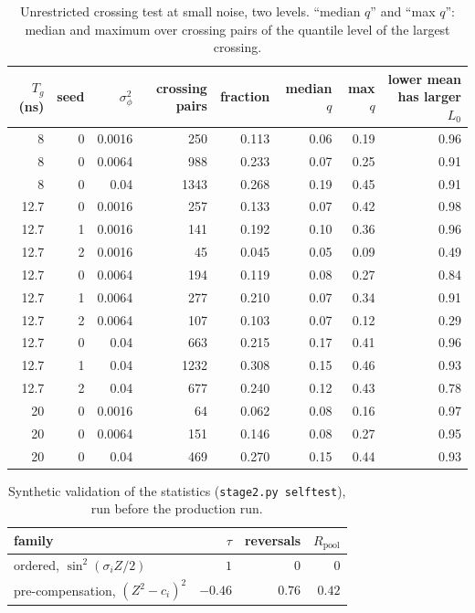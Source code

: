 \documentclass[aps,pra,onecolumn,notitlepage,superscriptaddress,nofootinbib,floatfix]{revtex4-2}
\begin{document}
\begin{table}[htbp]
\centering\small
\begin{tabular}{@{}rrrrrrrr@{}}
\toprule
$T_g$ (ns) & seed & $\sigma_\phi^2$ & crossing pairs & fraction & median $q$ & max $q$ & lower mean has larger $L_0$\\
\midrule
8 & 0 & 0.0016 & 250 & 0.113 & 0.06 & 0.19 & 0.96\\
8 & 0 & 0.0064 & 988 & 0.233 & 0.07 & 0.25 & 0.91\\
8 & 0 & 0.04 & 1343 & 0.268 & 0.19 & 0.45 & 0.91\\
12.7 & 0 & 0.0016 & 257 & 0.133 & 0.07 & 0.42 & 0.98\\
12.7 & 1 & 0.0016 & 141 & 0.192 & 0.10 & 0.36 & 0.96\\
12.7 & 2 & 0.0016 & 45 & 0.045 & 0.05 & 0.09 & 0.49\\
12.7 & 0 & 0.0064 & 194 & 0.119 & 0.08 & 0.27 & 0.84\\
12.7 & 1 & 0.0064 & 277 & 0.210 & 0.07 & 0.34 & 0.91\\
12.7 & 2 & 0.0064 & 107 & 0.103 & 0.07 & 0.12 & 0.29\\
12.7 & 0 & 0.04 & 663 & 0.215 & 0.17 & 0.41 & 0.96\\
12.7 & 1 & 0.04 & 1232 & 0.308 & 0.15 & 0.46 & 0.93\\
12.7 & 2 & 0.04 & 677 & 0.240 & 0.12 & 0.43 & 0.78\\
20 & 0 & 0.0016 & 64 & 0.062 & 0.08 & 0.16 & 0.97\\
20 & 0 & 0.0064 & 151 & 0.146 & 0.08 & 0.27 & 0.95\\
20 & 0 & 0.04 & 469 & 0.270 & 0.15 & 0.44 & 0.93\\
\bottomrule
\end{tabular}
\caption{Unrestricted crossing test at small noise, two levels. ``median
$q$'' and ``max $q$'': median and maximum over crossing pairs of the quantile
level of the largest crossing.}
\label{tab:crossing}
\end{table}

\begin{table}[htbp]
\centering\small
\begin{tabular}{@{}lrrr@{}}
\toprule
family & $\tau$ & reversals & $R_{\mathrm{pool}}$\\
\midrule
ordered, $\sin^2(\sigma_iZ/2)$ & $1$ & $0$ & $0$\\
pre-compensation, $(Z^2-c_i)^2$ & $-0.46$ & $0.76$ & $0.42$\\
\bottomrule
\end{tabular}
\caption{Synthetic validation of the statistics (\texttt{stage2.py selftest}), run before the production run.}
\label{tab:synthetic}
\end{table}
\end{document}
